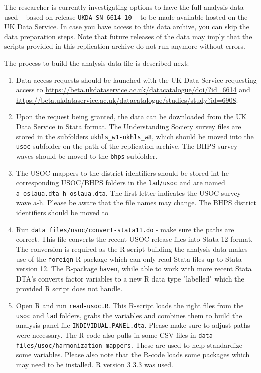 \documentclass[[a4paper,11pt]{article}
\newcommand{\code}[1]{\texttt{#1}}
\begin{document}
The researcher is currently investigating options to have the full analysis data used -- based on release \code{UKDA-SN-6614-10} -- to be made available hosted on the UK Data Service. In case you have access to this data archive, you can skip the data preparation steps. Note that future releases of the data may imply that the scripts provided in this replication archive do not run anymore without errors. 

The process to build the analysis data file is described next:

\begin{enumerate}

\item Data access requests should be launched with the UK Data Service requesting access to  \url{https://beta.ukdataservice.ac.uk/datacatalogue/doi/?id=6614} and \url{https://beta.ukdataservice.ac.uk/datacatalogue/studies/study?id=6908}.

\item Upon the request being granted, the data can be downloaded from the UK Data Service in Stata format. The Understanding Society survey files are stored in the subfolders \code{ukhls\_w1-ukhls\_w8}, which should be moved into the \code{usoc} subfolder on the path of the replication archive. The BHPS survey waves should be moved to the \code{bhps} subfolder. 

\item The USOC mappers to the district identifiers should be stored int he corresponding USOC/BHPS folders in the \code{lad/usoc} and are named \code{a\_oslaua.dta-h\_oslaua.dta}. The first letter indicates the USOC survey wave a-h. Please be aware that the file names may change. The BHPS district identifiers should be moved to 

\item Run \code{data files/usoc/convert-stata11.do} - make sure the paths are correct. This file converts the recent USOC release files into Stata 12 format. The conversion is required as the R-script building the analysis data makes use of the \code{foreign} R-package which can only read Stata files up to Stata version 12. The R-package \code{haven}, while able to work with more recent Stata DTA's converts factor variables to a new R data type "labelled" which the provided R script does not handle.

\item Open R and run \code{read-usoc.R}. This R-script loads the right files from the \code{usoc} and \code{lad} folders, grabs the variables and combines them to build the analysis panel file \code{INDIVIDUAL.PANEL.dta}. Please make sure to adjust paths were necessary.  The R-code also pulls in some CSV files in \code{data files/usoc/harmonization mappers}. These are used to help standardize some variables. Please also note that the R-code loads some packages which may need to be installed. R version 3.3.3 was used.

\end{enumerate}
\end{document}
